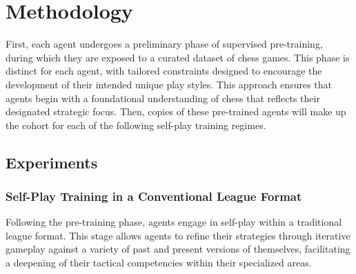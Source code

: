 \documentclass[journal]{IEEEtran}
\begin{document}
\begin{comment}
	Stockfish's significance in the field of artificial intelligence and computer chess is multi-faceted. 
	Firstly, it serves as a benchmark for evaluating the performance of emerging chess engines and AI systems, 
	providing a consistent and challenging standard against which the capabilities of new algorithms are measured. 
	Secondly, it functions as a vital research tool, aiding in the development of 
	reinforcement learning agents by offering a rich source of high-level game play and strategic diversity. 
	This engine, with its open-source nature, not only democratizes access to high-quality chess analysis but also fosters an 
	environment of shared learning and development, encouraging innovation in AI research and the broader field of game theory. 
	The use of Stockfish in training and evaluating chess agents underlines the importance of leveraging 
	established knowledge bases and computational tools to advance the state of AI in strategic game playing.
	\end{comment}
	
	
	\section{Methodology}
	\label{sec:methodology}
	
	First, each agent undergoes a preliminary phase of supervised pre-training, 
	during which they are exposed to a curated dataset of chess games. 
	This phase is distinct for each agent, with tailored constraints designed to encourage the development of their intended unique play styles. 
	This approach ensures that agents begin with a foundational understanding of chess that reflects their designated strategic focus.	
	Then, copies of these pre-trained agents will make up the cohort for each of the following self-play training regimes.
	
	\subsection{Experiments}
	
	\subsubsection{Self-Play Training in a Conventional League Format}
	Following the pre-training phase, agents engage in self-play within a traditional league format. 
	This stage allows agents to refine their strategies through iterative gameplay against a variety of past and present versions of themselves,
	facilitating a deepening of their tactical competencies within their specialized areas.
	
\end{document}
